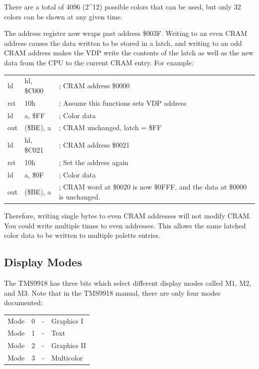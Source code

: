 \documentclass{article}
\begin{document}
There are a total of 4096 (2\^{}12) possible colors that can be used, but only
32 colors can be shown at any given time.

The address register now wraps past address \$003F. Writing to an even CRAM
address causes the data written to be stored in a latch, and writing to an odd
CRAM address makes the VDP write the contents of the latch as well as the new
data from the CPU to the current CRAM entry. For example:

\begin{table}[H]
    \centering
    \selectfont
    \begin{tabular}{p{1cm} p{1in} p{3.5in}}
        ld  &  hl, \$C000   & ; CRAM address \$0000                     \\
        rst &  10h          & ; Assume this functions sets VDP address  \\
        ld  &  a, \$FF      & ; Color data                              \\
        out &  (\$BE), a    & ; CRAM unchanged, latch = \$FF            \\
        ld  &  hl, \$C021   & ; CRAM address \$0021                     \\
        rst &  10h          & ; Set the address again                   \\
        ld  &  a, \$0F      & ; Color data                              \\
        out &  (\$BE), a    & ; CRAM word at \$0020 is now \$0FFF,
                                and the data at \$0000 is unchanged.    \\
    \end{tabular}
    \fontfamily{}\selectfont
\end{table}

Therefore, writing single bytes to even CRAM addresses will not modify CRAM.
You could write multiple times to even addresses. This allows the same latched
color data to be written to multiple palette entries.

\subsection{Display Modes}

The TMS9918 has three bits which select different display modes called M1, M2,
and M3. Note that in the TMS9918 manual, there are only four modes documented:

\begin{table}[H]
    \centering
    \begin{tabular}{l c c l}
        Mode & 0 & - & Graphics I   \\
        Mode & 1 & - & Text         \\
        Mode & 2 & - & Graphics II  \\
        Mode & 3 & - & Multicolor   \\
    \end{tabular}
\end{table}
\end{document}
